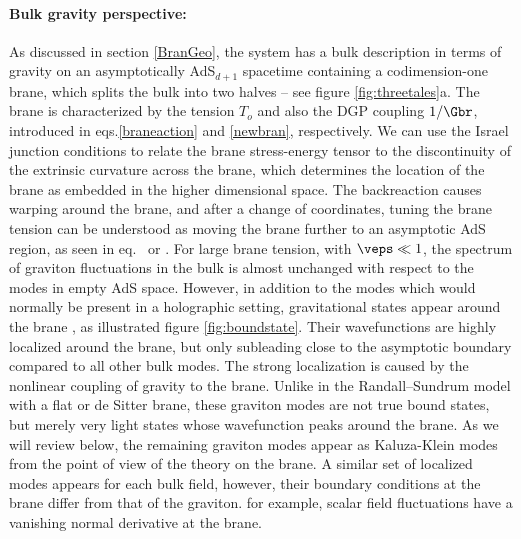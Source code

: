 \paragraph{Bulk gravity perspective:} As discussed in section \ref{BranGeo}, the system has a bulk description in terms of gravity on an asymptotically AdS$_{d+1}$ spacetime containing a codimension-one brane, which splits the bulk into two halves -- see figure \ref{fig:threetales}a. The brane is characterized by the tension $T_o$ and also the DGP coupling $1/\Gbr$, introduced in eqs.\eqref{braneaction} and \eqref{newbran}, respectively. We can use the Israel junction conditions  to relate the brane stress-energy tensor to the discontinuity of the extrinsic curvature across the brane, which determines the location of the brane as embedded in the higher dimensional space. The backreaction causes warping around the brane, and after a change of coordinates, tuning the brane tension can be understood as moving the brane further to an asymptotic AdS region, as seen in eq.~ or . For large brane tension, \ie with $\veps \ll 1$, the spectrum of graviton fluctuations in the bulk is almost unchanged with respect to the modes in empty AdS space. However, in addition to the modes which would normally be present in a holographic setting, gravitational states appear around the brane \cite{Randall:1999vf,Randall:1999ee,Karch:2000ct}, as illustrated figure \ref{fig:boundstate}. Their wavefunctions are highly localized around the brane, but only subleading close to the asymptotic boundary compared to all other bulk modes. The strong localization is caused by the nonlinear coupling of gravity to the brane. Unlike in the Randall--Sundrum model with a flat or de Sitter brane, these graviton modes are not true bound states, but merely very light states whose wavefunction peaks around the brane. As we will review below, the remaining graviton modes appear as Kaluza-Klein modes from the point of view of the theory on the brane. A similar set of localized modes appears for each bulk field, however, their boundary conditions at the brane differ from that of the graviton. for example, scalar field fluctuations have a vanishing normal derivative at the brane. 

